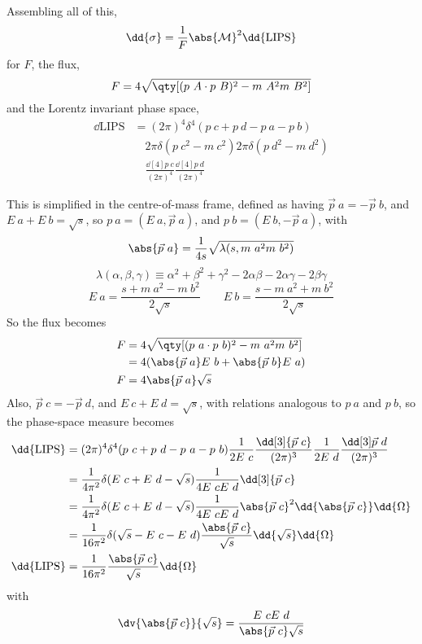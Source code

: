 Assembling all of this,
\begin{equation}
  \dd{\sigma} = \frac{1}{F} \abs{\mathcal{M}}^2 \dd{\text{LIPS}}
\end{equation}
for $F$, the flux,
\[ F = 4 \sqrt{\qty[ (p~A \cdot p~B)^2 - m~A^2 m~B^2]} \]
and the Lorentz invariant phase space,
\begin{align*}
  \dd{\text{LIPS}} &= (2 \pi)^4 \delta^4(p~c + p~d - p~a - p~b) \\
& \quad 2 \pi \delta(p~c^2 - m~c^2) 2 \pi \delta(p~d^2 - m~d^2) \\
& \quad \frac{\dd[4]{p~c}}{(2 \pi)^4} \frac{\dd[4]{p~d}}{(2 \pi)^4}
\end{align*}

This is simplified in the centre-of-mass frame, defined as having
$\vec{p}~a = - \vec{p}~b$, and $E~a + E~b = \sqrt{s}$, so
$p~a = (E~a, \vec{p}~a)$, and $p~b = (E~b, - \vec{p}~a)$, with
\[ \abs{\vec{p}~a} = \frac{1}{4s} \sqrt{\lambda(s, m~a^2 m~b^2)} \]
\[ \lambda(\alpha, \beta, \gamma) \equiv \alpha^2 + \beta^2 + \gamma^2 - 2 \alpha \beta - 2 \alpha \gamma - 2 \beta \gamma \]
\[ E~a = \frac{s+m~a^2 - m~b^2}{2 \sqrt{s}} \qquad E~b= \frac{s - m~a^2 + m~b^2}{2 \sqrt{s}} \]
So the flux becomes
\begin{align*}
  F &= 4 \sqrt{\qty[(p~a \cdot p~b)^2 - m~a^2 m~b^2]} \\ &= 4 ( \abs{\vec{p}~a} E~b + \abs{\vec{p}~b} E~a ) \\ F &= 4 \abs{\vec{p}~a} \sqrt{s}
\end{align*}
Also, $\vec{p}~c = - \vec{p}~d$, and $E~c+E~d = \sqrt{s}$, with
relations analogous to $p~a$ and $p~b$, so the phase-space measure
becomes
\begin{align*}
  \dd{\text{LIPS}} &= (2 \pi)^4 \delta^4(p~c + p~d - p~a - p~b) \frac{1}{2 E~c} \frac{\dd[3]{\vec{p}~c}}{(2 \pi)^3} \frac{1}{2 E~d} \frac{\dd[3]\vec{p}~d}{(2 \pi)^3} \\
&= \frac{1}{4 \pi^2} \delta(E~c + E~d - \sqrt{s}) \frac{1}{4 E~c E~d} \dd[3]{\vec{p}~c} \\
&= \frac{1}{4 \pi^2} \delta(E~c + E~d - \sqrt{s}) \frac{1}{4 E~c E~d} \abs{\vec{p}~c}^2 \dd{\abs{\vec{p}~c}} \dd{\Omega} \\
&= \frac{1}{16 \pi^2} \delta( \sqrt{s}-E~c - E~d) \frac{\abs{\vec{p}~c}}{\sqrt{s}} \dd{\sqrt{s}} \dd{\Omega} \\
\dd{\text{LIPS}}&= \frac{1}{16 \pi^2} \frac{\abs{\vec{p}~c}}{\sqrt{s}} \dd{\Omega}
\end{align*}
with 
\[ \dv{\abs{\vec{p}~c}}{\sqrt{s}} = \frac{E~c E~d}{\abs{\vec{p}~c} \sqrt{s}} \]


